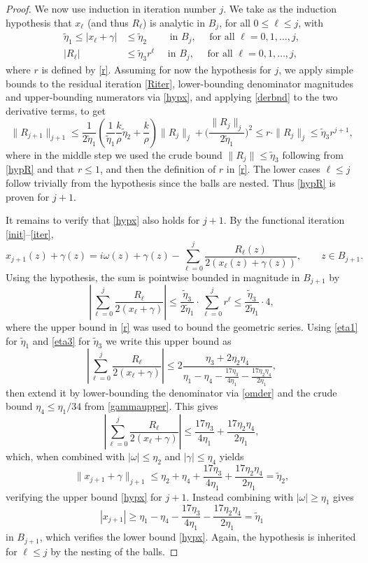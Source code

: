\documentclass[10pt]{article}
\newcommand{\om}{\omega}
\newcommand{\g}{\gamma}
\newcommand{\te}{\tilde\eta}
\begin{document}
\begin{proof}
  We now use induction in iteration number $j$.
    We take as the induction hypothesis that $x_\ell$ (and thus $R_\ell$)
  is analytic in $B_j$, for all $0\le \ell \le j$, with
  \begin{align}
      \te_1 \leq |x_\ell + \g| &\leq \te_2
  \qquad \mbox{ in } B_j, \quad \mbox{ for all } \ell = 0,1,\dots,j,
  \label{hypx} \\
      |R_\ell| &\leq \te_3 r^\ell \quad \mbox{ in } B_j, \quad \mbox{ for all } \ell = 0,1,\dots,j,
  \label{hypR}
  \end{align}
  where $r$ is defined by \cref{r}.
  Assuming for now the hypothesis for $j$, we apply simple bounds to the
  residual iteration \cref{Riter},
  lower-bounding denominator magnitudes and upper-bounding numerators
  via \cref{hypx},
  and applying \cref{derbnd} to the two derivative terms, to get
  $$
  \|R_{j+1}\|_{j+1}
  \leq
  \frac{1}{2\te_1}\left(
  \frac{1}{\te_1} \frac{k}{\rho}\te_2 + \frac{k}{\rho}
  \right)\|R_j\|_j
  +\biggl(\frac{\|R_j\|_j}{2\te_1}\biggr)^2
  \leq
  r \cdot \|R_j\|_j
  \leq
  \te_3 r^{j+1},
  $$
where in the middle step we used the crude bound $\|R_j\| \le \te_3$
following from \cref{hypR} and that $r\le1$, and then the definition of $r$ in \cref{r}.
The lower cases $\ell\le j$ follow trivially from the hypothesis since the balls
are nested.
Thus \cref{hypR} is proven for $j+1$.

It remains to verify that \cref{hypx} also holds for $j+1$.
By the functional iteration \cref{init}--\cref{iter},
$$
x_{j+1}(z) + \g(z) = i\om(z) + \g(z) - \sum_{\ell=0}^{j} \frac{R_\ell(z)}{2 \left(x_\ell(z) + \g(z)\right)},
\qquad z\in B_{j+1}.
$$
Using the hypothesis, the sum is pointwise bounded in magnitude
in $B_{j+1}$ by
$$
\left|\sum_{\ell=0}^{j} \frac{R_\ell}{2\left( x_\ell + \g \right)} \right|
\leq \frac{\te_3}{2\te_1} \cdot \sum_{\ell=0}^j r^{\ell}
\leq \frac{\te_3}{2\te_1} \cdot 4,
$$
where the upper bound in \cref{r} was used to bound the geometric series.
Using \cref{eta1} for $\te_1$ and \cref{eta3} for $\te_3$ we write this upper bound as
$$
\left|\sum_{\ell=0}^{j} \frac{R_\ell}{2\left( x_\ell + \g \right)} \right|
\leq
2\frac{\eta_3 + 2\eta_2\eta_4}{\eta_1 - \eta_4 - \frac{17\eta_3}{4\eta_1} - \frac{17\eta_2\eta_4}{2\eta_1}},
$$
then extend it by lower-bounding the denominator via \cref{omder} and the crude bound ${\eta_4 \leq \eta_1/34}$ from \cref{gammaupper}. This gives
$$
\left|\sum_{\ell=0}^{j} \frac{R_\ell}{2\left( x_\ell + \g \right)} \right| 
\leq
\frac{17\eta_3}{4\eta_1} + \frac{17\eta_2\eta_4}{2\eta_1},
$$
which, when combined with $|\om| \leq \eta_2$ and $|\g| \leq \eta_4$ yields
$$\|x_{j+1} + \g\|_{j+1} \le \eta_2 + \eta_4 + \frac{17\eta_3}{4\eta_1} + \frac{17\eta_2\eta_4}{2\eta_1} = \te_2,$$
verifying the upper bound \cref{hypx} for $j+1$.
Instead combining with $|\om| \ge \eta_1$ gives
$$ |x_{j+1}| \ge \eta_1 - \eta_4 - \frac{17\eta_3}{4\eta_1} - \frac{17\eta_2\eta_4}{2\eta_1} = \te_1 $$
in $B_{j+1}$, which verifies the lower bound \cref{hypx}.
Again, the hypothesis is inherited for $\ell\le j$ by the nesting of the balls.


\end{proof}
\end{document}
